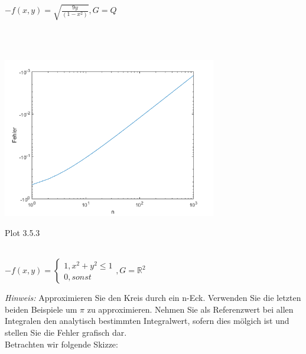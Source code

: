\documentclass[a4paper,11pt,bibliography=totoc,listof=totoc,headinclude=true,cleardoublepage=empty,oneside]{scrbook}
\begin{document}
				\vspace{2cm}
				
\color{change2}
		\flushleft	 $-f(x,y)= \sqrt{\frac{9y}{(1-x^2)}} , G=\hat{Q} $
			
					
					\color{change}
				\lstset{ 
					language=Matlab, 
					showstringspaces=false}
				
				 
				\begin{lstlisting} 
				
				
				\end{lstlisting}
				\color{change2}			
				
				
				\color{change2}
				\begin{centering}
					\includegraphics[width=0.7\textwidth]{plot_3_5_3.png} \\
					\centerline{Plot 3.5.3}
					\hspace{0cm}		
					\label{fig:Bild1}
				\end{centering} \\
			
			
					$ -f(x,y) = \begin{cases} 
					1, x^2+y^2 \leq 1 \\
					0, sonst
					\end{cases} , G=\mathbb{R}^2$
					
						\textit{Hinweis:} Approximieren Sie den Kreis durch ein n-Eck.
						Verwenden Sie die letzten beiden Beispiele um $\pi$ zu approximieren.
						Nehmen Sie als Referenzwert bei allen Integralen den analytisch bestimmten Integralwert, sofern dies mölgich ist und stellen Sie die Fehler grafisch dar.\\ Betrachten wir folgende Skizze:\\
						
\end{document}
